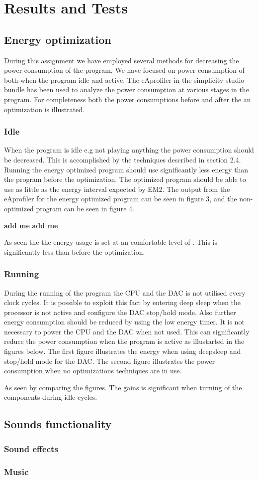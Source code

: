 \section{Results and Tests}

\subsection{Energy optimization}
During this assignment we have employed several methods for decreasing the power consumption of the program. We have focused on power consumption of both when the program idle and active. The eAprofiler in the simplicity studio bundle has been used to analyze the power consumption at various stages in the program. For completeness both the power consumptions before and after the an optimization is illustrated.


\subsubsection{Idle}
When the program is idle e.g not playing anything the power consumption should be decreased. This is accomplished by the techniques described in section 2.4. Running the energy optimized program should use significantly less energy than the program before the optimization. The optimized program should be able to use as little as the energy interval expected by EM2. The output from the eAprofiler for the energy optimized program can be seen in figure 3, and the non-optimized program can be seen in figure 4.



{\bf add me}
{\bf add me}

As seen the the energy usage is set at an comfortable level of  . This is significantly less than before the optimization. 




\subsubsection{Running}
During the running of the program the CPU and the DAC is not utilised every clock cycles. It is possible to exploit this fact by entering deep sleep when the processor is not active and configure the DAC stop/hold mode. Also further energy consumption should be reduced by using the low energy timer. It is not necessary to power the CPU and the DAC when not used. This can significantly reduce the power consumption when the program is active as illustarted in the figures below. The first figure illustrates the energy when using deepsleep and stop/hold mode for the DAC. The second figure illustrates the power consumption when no optimizations techniques are in use.  


As seen by comparing the figures. The gains is significant when turning of the components during idle cycles. 


\subsection{Sounds functionality}


\subsubsection{Sound effects}


\subsubsection{Music}


